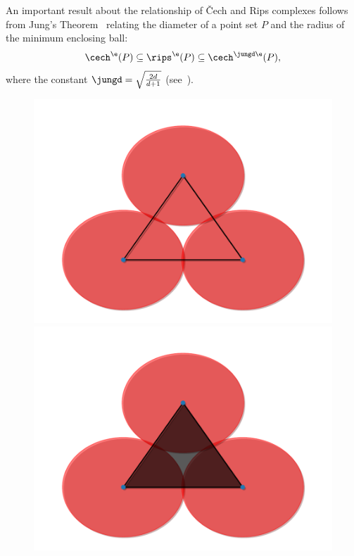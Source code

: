 An important result about the relationship of \v Cech and Rips complexes follows from Jung's Theorem~\cite{jung01uber} relating the diameter of a point set $P$ and the radius of the minimum enclosing ball:
\begin{equation}\label{eq:jung_inclusion}
  \cech^\e(P) \subseteq \rips^\e(P) \subseteq \cech^{\jungd \e}(P),
\end{equation}
where the constant $\jungd = \sqrt{\frac{2d}{d+1}}$ (see~\cite{buchet15efficient}).

\begin{figure}[htbp]
 \centering
     \includegraphics[scale=0.23]{figures/include1.pdf}
     \includegraphics[scale=0.23]{figures/include2.pdf}

\end{figure}
